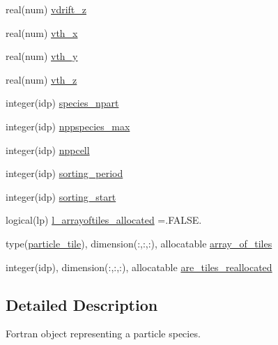\begin{DoxyCompactItemize}
\item 
real(num) \hyperlink{structparticle__speciesmodule_1_1particle__species_abe947e62e9f02647421983bab36fd3b4}{vdrift\+\_\+z}
\item 
real(num) \hyperlink{structparticle__speciesmodule_1_1particle__species_a0aac3d8c006510865b01a1c92f12518d}{vth\+\_\+x}
\item 
real(num) \hyperlink{structparticle__speciesmodule_1_1particle__species_a24a2e879d8fabf97d081e857e2307781}{vth\+\_\+y}
\item 
real(num) \hyperlink{structparticle__speciesmodule_1_1particle__species_aaa81b5d65f657ac14030dc1b173f2c3f}{vth\+\_\+z}
\item 
integer(idp) \hyperlink{structparticle__speciesmodule_1_1particle__species_a76ebc6a561029fa9850569bde01428be}{species\+\_\+npart}
\item 
integer(idp) \hyperlink{structparticle__speciesmodule_1_1particle__species_ae60b4ef189f4777fcbd38c8fa083b6a5}{nppspecies\+\_\+max}
\item 
integer(idp) \hyperlink{structparticle__speciesmodule_1_1particle__species_a85d9fbe02cbe094dd5d45b29e5a5cb52}{nppcell}
\item 
integer(idp) \hyperlink{structparticle__speciesmodule_1_1particle__species_a4bb668ad609f86bc2e0832a79d262f76}{sorting\+\_\+period}
\item 
integer(idp) \hyperlink{structparticle__speciesmodule_1_1particle__species_a28962e064910019368a651104e5104c1}{sorting\+\_\+start}
\item 
logical(lp) \hyperlink{structparticle__speciesmodule_1_1particle__species_a7925d60d14a0ec4da1bb9fffb5e5f2ef}{l\+\_\+arrayoftiles\+\_\+allocated} =.F\+A\+L\+S\+E.
\item 
type(\hyperlink{structparticle__tilemodule_1_1particle__tile}{particle\+\_\+tile}), dimension(\+:,\+:,\+:), allocatable \hyperlink{structparticle__speciesmodule_1_1particle__species_adf3862efae3787dab97df9f9064b65d9}{array\+\_\+of\+\_\+tiles}
\item 
integer(idp), dimension(\+:,\+:,\+:), allocatable \hyperlink{structparticle__speciesmodule_1_1particle__species_acfd22fe918c6c278d3e6cd7d4ae1d6f9}{are\+\_\+tiles\+\_\+reallocated}
\end{DoxyCompactItemize}


\subsection{Detailed Description}
Fortran object representing a particle species. 

